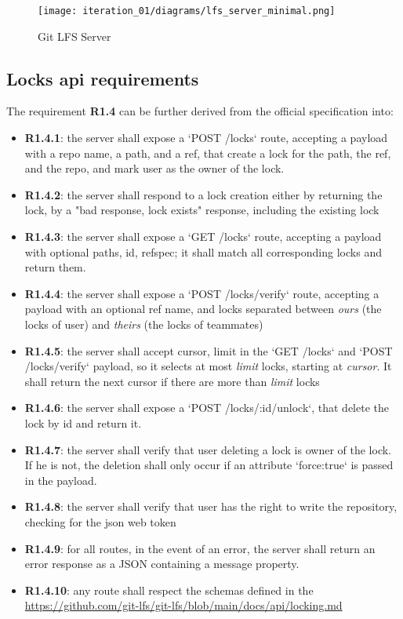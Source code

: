 \begin{figure}[H]
    \centering
    \texttt{[image: iteration\_01/diagrams/lfs\_server\_minimal.png]}
    \caption{Git LFS Server}
    \label{fig:lfs_server_minimal}
\end{figure}

\subsection{Locks api requirements}

The requirement \textbf{R1.4} can be further derived from the official specification into:

\begin{itemize}
    \item \textbf{R1.4.1}: the server shall expose a `POST /locks` route, accepting a payload with a repo name, a path, and a ref, that create a lock for the path, the ref, and the repo, and mark user as the owner of the lock.
    \item \textbf{R1.4.2}: the server shall respond to a lock creation either by returning the lock, by a "bad response, lock exists" response, including the existing lock
    \item \textbf{R1.4.3}: the server shall expose a `GET /locks` route, accepting a payload with optional paths, id, refspec; it shall match all corresponding locks and return them.
    \item \textbf{R1.4.4}: the server shall expose a `POST /locks/verify` route, accepting a payload with an optional ref name, and locks separated between \textit{ours} (the locks of user) and \textit{theirs} (the locks of teammates)
    \item \textbf{R1.4.5}: the server shall accept cursor, limit in the `GET /locks` and `POST /locks/verify` payload, so it selects at most \textit{limit} locks, starting at \textit{cursor}. It shall return the next cursor if there are more than \textit{limit} locks
    \item \textbf{R1.4.6}: the server shall expose a `POST /locks/:id/unlock`, that delete the lock by id and return it.
    \item \textbf{R1.4.7}: the server shall verify that user deleting a lock is owner of the lock. If he is not, the deletion shall only occur if an attribute `force:true` is passed in the payload.
    \item \textbf{R1.4.8}: the server shall verify that user has the right to write the repository, checking for the json web token
    \item \textbf{R1.4.9}: for all routes, in the event of an error, the server shall return an error response as a JSON containing a message property.
    \item \textbf{R1.4.10}: any route shall respect the schemas defined in the \url{https://github.com/git-lfs/git-lfs/blob/main/docs/api/locking.md}
\end{itemize}

